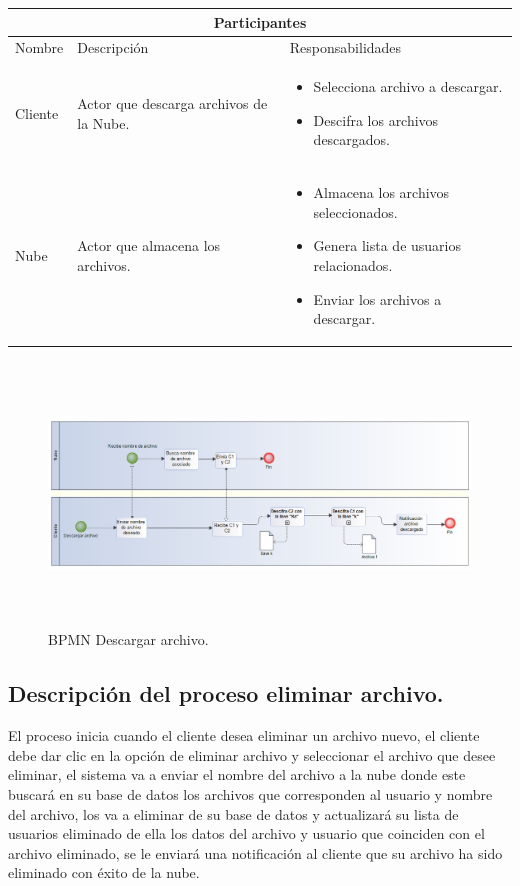 \begin{tabular}{ |p{2cm}|p{6cm}|p{6cm}| }
\hline
\multicolumn{3}{|c|}{ Participantes } \\
\hline

{ Nombre } & { Descripción } & { Responsabilidades} \\
\hline
{ Cliente } & Actor que descarga archivos de la Nube. & 
\begin{itemize} 
\item Selecciona archivo a descargar.
\item Descifra los archivos descargados.
\end{itemize} \\ 
\hline
{ Nube } & Actor que almacena los archivos. & 
\begin{itemize} 
\item Almacena los archivos seleccionados.
\item Genera lista de usuarios relacionados.
\item Enviar los archivos a descargar.
\end{itemize} \\ 
\hline
\end{tabular}

\begin{figure}[H]
\centering
\includegraphics[width=16cm, height=7cm]{./images/BPM_Descargar.png}
\caption{BPMN Descargar archivo.}

\end{figure}

\vspace{3cm}
\subsection{Descripción del proceso eliminar archivo.}

El proceso inicia cuando el cliente desea eliminar un archivo nuevo, el cliente debe dar clic en la opción de eliminar archivo y seleccionar el archivo que desee eliminar, el sistema va a enviar el nombre del archivo a la nube donde este buscará en su base de datos los archivos que corresponden al usuario y nombre del archivo, los va a eliminar de su base de datos y actualizará su lista de usuarios eliminado de ella los datos del archivo y usuario que coinciden con el archivo eliminado, se le enviará una notificación al cliente que su archivo ha sido eliminado con éxito de la nube.\\



